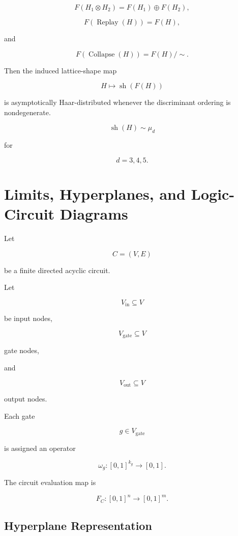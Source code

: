 \documentclass[12pt,oneside]{article}
\theoremstyle{definition}
\theoremstyle{remark}
\begin{document}
\[
F(H_1\otimes H_2)
=
F(H_1)\oplus F(H_2),
\]

\[
F(\operatorname{Replay}(H))
=
F(H),
\]

and

\[
F(\operatorname{Collapse}(H))
=
F(H)/{\sim}.
\]

Then the induced lattice-shape map

\[
H
\mapsto
\operatorname{sh}(F(H))
\]

is asymptotically Haar-distributed whenever the discriminant ordering is
nondegenerate.

\[
\boxed{
\operatorname{sh}(H)
\sim
\mu_d
}
\]

for

\[
d=3,4,5.
\]

\section{Limits, Hyperplanes, and Logic-Circuit Diagrams}

Let

\[
C=(V,E)
\]

be a finite directed acyclic circuit.

Let

\[
V_{\mathrm{in}}
\subseteq
V
\]

be input nodes,

\[
V_{\mathrm{gate}}
\subseteq
V
\]

gate nodes,

and

\[
V_{\mathrm{out}}
\subseteq
V
\]

output nodes.

Each gate

\[
g\in V_{\mathrm{gate}}
\]

is assigned an operator

\[
\omega_g:
[0,1]^{k_g}
\rightarrow
[0,1].
\]

The circuit evaluation map is

\[
F_C:
[0,1]^n
\rightarrow
[0,1]^m.
\]

\subsection*{Hyperplane Representation}
\end{document}

